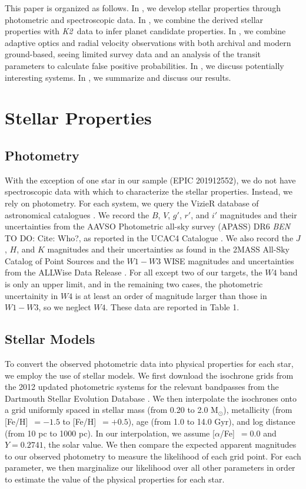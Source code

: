 \documentclass{emulateapj}
\newcommand{\project}[1]{\textsl{#1}}
\newcommand{\KT}{\project{K2}}
\newcommand{\msun}{{M$_\odot$}}
\newcommand{\feh}{{[Fe/H]}~}
\newcommand{\afe}{{[$\alpha$/Fe]}~}
\newcommand{\todo}[3]{{\color{#2} \emph{#1} TO DO: #3}}
\newcommand{\btmtodo}[1]{\todo{BEN}{red}{#1}}
\begin{document}
This paper is organized as follows.
In , we develop stellar properties through
photometric and spectroscopic data.
In , we combine the derived stellar properties with \KT\ data to infer planet
candidate properties.
In , we combine adaptive optics and radial velocity observations with both
archival and modern ground-based, seeing limited survey data and an analysis of the
transit parameters to calculate false positive probabilities.
In , we discuss potentially interesting systems.
In , we summarize and discuss our results.


\section{Stellar Properties}
\subsection{Photometry}

With the exception of one star in our sample (EPIC 201912552), we do not have
spectroscopic data with which to characterize the stellar properties.
Instead, we rely on photometry.
For each system, we query the VizieR database of astronomical catalogues
\citep{Ochseinbein00}.
We record the $B$, $V$, $g'$, $r'$, and $i'$ magnitudes and their
uncertainties from the AAVSO Photometric all-sky survey (APASS) DR6
\btmtodo{Cite: Who?}, as reported in the UCAC4 Catalogue \citep{Zacharias12}.
We also record the $J$, $H$, and $K$ magnitudes and their uncertainties
as found in the 2MASS All-Sky Catalog of Point Sources \citep{Cutri03}
and the $W1-W3$ WISE magnitudes and uncertainties from the ALLWise Data
Release \citep{Cutri13}.
For all except two of our targets, the $W4$ band is only an upper limit,
and in the remaining two cases, the photometric uncertainity in $W4$ is at least an
order of magnitude larger than those in $W1-W3$, so we neglect $W4$.
These data are reported in Table 1.


\subsection{Stellar Models}
To convert the observed photometric data into physical properties for each
star, we employ the use of stellar models.
We first download the isochrone grids from the 2012 updated photometric
systems for the relevant bandpasses from the Dartmouth Stellar Evolution
Database \citep{Dotter08}.
We then interpolate the isochrones onto a grid uniformly spaced in
stellar mass (from 0.20 to 2.0 \msun), metallicity (from \feh$=-1.5$ to
\feh$=+0.5$), age (from 1.0 to 14.0 Gyr), and log distance (from 10 pc to
1000 pc).
In our interpolation, we assume \afe$=0.0$ and $Y=0.2741$, the solar value.
We then compare the expected apparent magnitudes to our observed photometry
to measure the likelihood of each grid point.
For each parameter, we then marginalize our likelihood over all other
parameters in order to estimate the value of the physical properties
for each star.
\end{document}
